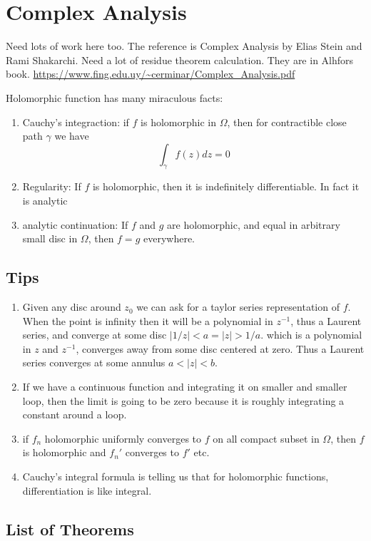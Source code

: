 \documentclass[main.tex]{subfiles}
\begin{document}
\section{Complex Analysis}
Need lots of work here too.
The reference is Complex Analysis by Elias Stein and Rami Shakarchi. Need a lot of residue theorem calculation. They are in Alhfors book. \url{https://www.fing.edu.uy/~cerminar/Complex_Analysis.pdf}

Holomorphic function has many miraculous facts:
\begin{enumerate}
    \item Cauchy's integraction: if $f$ is holomorphic in $\Omega$, then for contractible close path $\gamma$ we have 
    $$
    \int_\gamma f(z) dz = 0
    $$
    \item Regularity: If $f$ is holomorphic, then it is indefinitely differentiable. In fact it is analytic
    \item analytic continuation: If $f$ and $g$ are holomorphic, and equal in arbitrary small disc in $\Omega$, then $f = g$ everywhere.
\end{enumerate}

\subsection{Tips}
\begin{enumerate}
    \item Given any disc around $z_0$ we can ask for a taylor series representation of $f$. When the point is infinity then it will be a polynomial in $z^{-1}$, thus a Laurent series, and converge at some disc $|1/z| < a = |z| > 1/a$.
    which is a polynomial in $z$ and $z^{-1}$, converges away from some disc centered at zero. Thus a Laurent series converges at some annulus $a < |z| < b$.
    \item If we have a continuous function and integrating it on smaller and smaller loop, then the limit is going to be zero because it is roughly integrating a constant around a loop.
    \item if $f_n$ holomorphic uniformly converges to $f$ on all compact subset in $\Omega$, then $f$ is holomorphic and $f_n '$ converges to $f'$ etc.
    \item Cauchy's integral formula is telling us that for holomorphic functions, differentiation is like integral.
\end{enumerate}

\subsection{List of Theorems}
\end{document}
